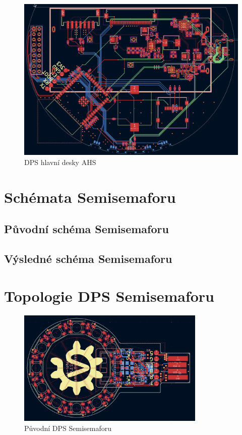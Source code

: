 \begin{figure}[!h]
	\begin{center}
	  \includegraphics[angle = -90, width=\textwidth]{text/PraktickaCast/img/AHS-DPS-HlavniDeska.png}
	\end{center}
	\caption{DPS hlavní desky AHS}
\end{figure}

\newpage

\chapter{Schémata Semisemaforu}
\section{Původní schéma Semisemaforu}
\label{Semisemafor-sch-v1}


\section{Výsledné schéma Semisemaforu}
\label{Semisemafor-sch-v2}


\chapter{Topologie DPS Semisemaforu}
\begin{figure}[!h]
	\begin{center}
	  \includegraphics[angle = -90, width=0.8\textwidth]{text/PraktickaCast/img/Semisemafor-PCB-V1.png}
	\end{center}
	\caption{Původní DPS Semisemaforu}
	\label{Semisemafor-pcb-v1}
\end{figure}
